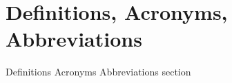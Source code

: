 \documentclass[../../../../dd.tex]{subfiles}
\begin{document}
	\section{Definitions, Acronyms, Abbreviations}

	Definitions Acronyms Abbreviations section
\end{document}
